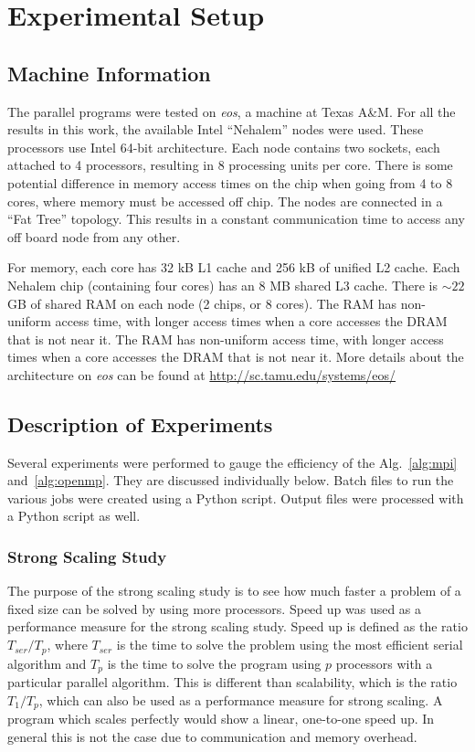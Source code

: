 \documentclass[12pt]{article}
\begin{document}
{{{\section{Experimental Setup}

\subsection{Machine Information}

The parallel programs were tested on \emph{eos}, a machine at Texas A\&M. For all the
results in this work, the available Intel ``Nehalem'' nodes were used. These
processors use Intel 64-bit architecture.  Each node contains two sockets, each
attached to 4 processors, resulting in 8 processing units per core.  There is some potential difference in
memory access times on the chip when going from 4 to 8 cores, where memory must be
accessed off chip.  The nodes are connected in a ``Fat Tree'' topology.  This
results in a constant communication time to access any off board node from any other.

For memory, each core has 32 kB L1 cache and 256 kB of unified L2 cache. Each Nehalem
chip (containing four cores) has an 8 MB shared L3 cache.  There is $\sim 22$ GB of
shared RAM on each node (2 chips, or 8 cores). The RAM has non-uniform access time,
with longer access times when a core accesses the DRAM that is not near it. The RAM
has non-uniform access time, with longer access times when a core accesses the DRAM
that is not near it. More details about the architecture on \emph{eos} can be found
at \url{http://sc.tamu.edu/systems/eos/}

\subsection{Description of Experiments}

Several experiments were performed to gauge the efficiency of the Alg.~\ref{alg:mpi}
and~\ref{alg:openmp}. They are discussed individually below. Batch files to run the
various jobs were created using a Python script.  Output files were processed with a
Python script as well. 

\subsubsection{Strong Scaling Study} 

The purpose of the strong scaling
study is to see how much faster a problem of a fixed size can be solved by
using more processors.  Speed up was used as a performance measure for the strong
scaling study.   Speed up is defined as the ratio $T_{ser}/T_p$, where $T_{ser}$ is the time to solve the problem using the most
efficient serial algorithm and $T_{p}$ is the time to solve the program using $p$
processors with a particular parallel algorithm.  This is different than scalability,
which is the ratio $T_{1}/T_{p}$, which can also be used as a performance measure for
strong scaling.  A program which scales perfectly would show a linear, one-to-one
speed up.  In general this is not the case due to communication and memory overhead.

}}}
\end{document}
